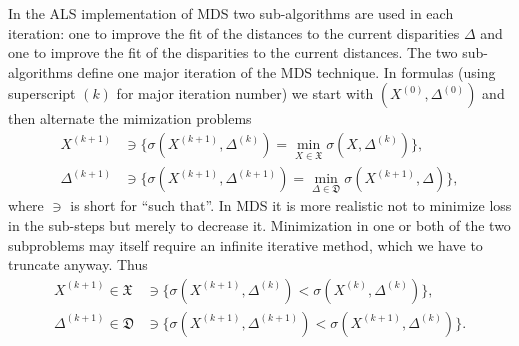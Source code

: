 \documentclass[
  12pt,
  letterpaper,
  DIV=11,
  numbers=noendperiod]{scrartcl}
\theoremstyle{plain}
\theoremstyle{remark}
\begin{document}
In the ALS implementation of MDS two sub-algorithms are used in each
iteration: one to improve the fit of the distances to the current
disparities \(\Delta\) and one to improve the fit of the disparities to
the current distances. The two sub-algorithms define one major iteration
of the MDS technique. In formulas (using superscript \((k)\) for major
iteration number) we start with \((X^{(0)},\Delta^{(0)})\) and then
alternate the mimization problems \begin{subequations}
\begin{align}
X^{(k+1)}&\ni\{\sigma(X^{(k+1)},\Delta^{(k)})=\min_{X\in\mathfrak{X}}\sigma(X,\Delta^{(k)})\},\\
\Delta^{(k+1)}&\ni\{\sigma(X^{(k+1)},\Delta^{(k+1)})=\min_{\Delta\in\mathfrak{D}}\sigma(X^{(k+1)},\Delta)\},
\end{align}
\end{subequations} where \(\ni\) is short for ``such that''. In MDS it
is more realistic not to minimize loss in the sub-steps but merely to
decrease it. Minimization in one or both of the two subproblems may
itself require an infinite iterative method, which we have to truncate
anyway. Thus \begin{subequations}
\begin{align}
X^{(k+1)}\in\mathfrak{X}&\ni\{\sigma(X^{(k+1)},\Delta^{(k)})<\sigma(X^{(k)},\Delta^{(k)})\},\\
\Delta^{(k+1)}\in\mathfrak{D}&\ni\{\sigma(X^{(k+1)},\Delta^{(k+1)})<\sigma(X^{(k+1)},\Delta^{(k)})\}.
\end{align}
\end{subequations}
\end{document}
